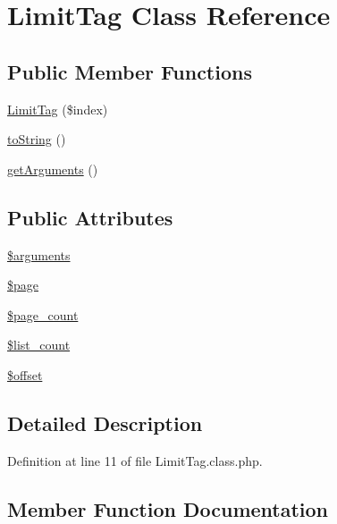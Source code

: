 \hypertarget{classLimitTag}{}\section{Limit\+Tag Class Reference}
\label{classLimitTag}
\subsection*{Public Member Functions}
\begin{DoxyCompactItemize}
\item 
\hyperlink{classLimitTag_a9b5dbee572b93d0ae32089e8deed7462}{Limit\+Tag} (\$index)
\item 
\hyperlink{classLimitTag_ae557d296324baf6a0381b18361353e85}{to\+String} ()
\item 
\hyperlink{classLimitTag_ad38599eb066d0e868cc7d584979db070}{get\+Arguments} ()
\end{DoxyCompactItemize}
\subsection*{Public Attributes}
\begin{DoxyCompactItemize}
\item 
\hyperlink{classLimitTag_aca5deed1e4200fbc10bf96b3af1bb0aa}{\$arguments}
\item 
\hyperlink{classLimitTag_aae0faff40b6bcd38d72350bd851ecd4b}{\$page}
\item 
\hyperlink{classLimitTag_a3d25270d024a280ac3e1cc7ada2c8fe0}{\$page\+\_\+count}
\item 
\hyperlink{classLimitTag_aec51c8433d2e7a1e009b7c331702cef0}{\$list\+\_\+count}
\item 
\hyperlink{classLimitTag_adbc76de9e00e8d0a724e49dec7e208ae}{\$offset}
\end{DoxyCompactItemize}


\subsection{Detailed Description}


Definition at line 11 of file Limit\+Tag.\+class.\+php.



\subsection{Member Function Documentation}
\mbox{\label{classLimitTag_ad38599eb066d0e868cc7d584979db070}} 
